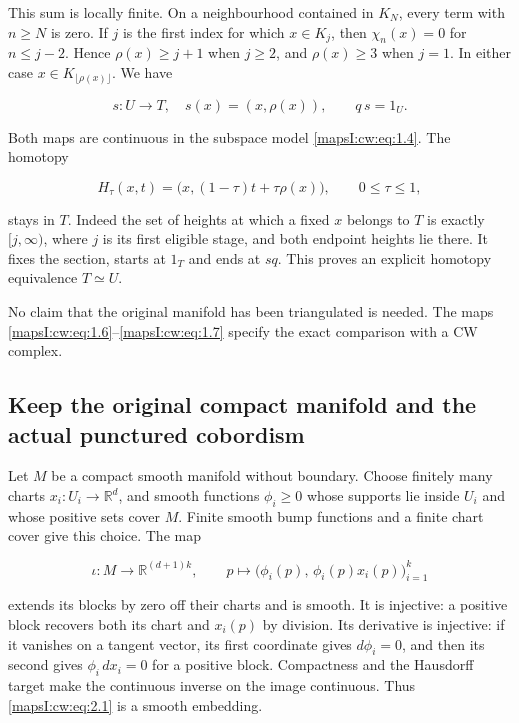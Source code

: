 This sum is locally finite. On a neighbourhood contained in \(K_N\), every term with \(n\geq N\) is zero. If \(j\) is the first index for which \(x\in K_j\), then \(\chi_n(x)=0\) for \(n\leq j-2\). Hence \(\rho(x)\geq j+1\) when \(j\geq2\), and \(\rho(x)\geq3\) when \(j=1\). In either case \(x\in K_{\lfloor\rho(x)\rfloor}\). We have

\begin{equation}
s:U\longrightarrow T,\quad s(x)=(x,\rho(x)),\qquad q\,s=1_U.
\label{mapsI:cw:eq:1.6}
\end{equation}

Both maps are continuous in the subspace model \eqref{mapsI:cw:eq:1.4}. The homotopy

\begin{equation}
H_\tau(x,t)=\bigl(x,(1-\tau)t+\tau\rho(x)\bigr),
\qquad 0\leq\tau\leq1,
\label{mapsI:cw:eq:1.7}
\end{equation}

stays in \(T\). Indeed the set of heights at which a fixed \(x\) belongs to \(T\) is exactly \([j,\infty)\), where \(j\) is its first eligible stage, and both endpoint heights lie there. It fixes the section, starts at \(1_T\) and ends at \(s q\). This proves an explicit homotopy equivalence \(T\simeq U\).

No claim that the original manifold has been triangulated is needed. The maps \eqref{mapsI:cw:eq:1.6}--\eqref{mapsI:cw:eq:1.7} specify the exact comparison with a CW complex.

\subsection{Keep the original compact manifold and the actual punctured cobordism}
\label{mapsI:cw:cw-manifolds}

Let \(M\) be a compact smooth manifold without boundary. Choose finitely many charts \(x_i:U_i\to\mathbb R^d\), and smooth functions \(\phi_i\geq0\) whose supports lie inside \(U_i\) and whose positive sets cover \(M\). Finite smooth bump functions and a finite chart cover give this choice. The map

\begin{equation}
\iota:M\longrightarrow\mathbb R^{(d+1)k},\qquad
p\longmapsto\bigl(\phi_i(p),\,\phi_i(p)x_i(p)\bigr)_{i=1}^k
\label{mapsI:cw:eq:2.1}
\end{equation}

extends its blocks by zero off their charts and is smooth. It is injective: a positive block recovers both its chart and \(x_i(p)\) by division. Its derivative is injective: if it vanishes on a tangent vector, its first coordinate gives \(d\phi_i=0\), and then its second gives \(\phi_i\,dx_i=0\) for a positive block. Compactness and the Hausdorff target make the continuous inverse on the image continuous. Thus \eqref{mapsI:cw:eq:2.1} is a smooth embedding.

